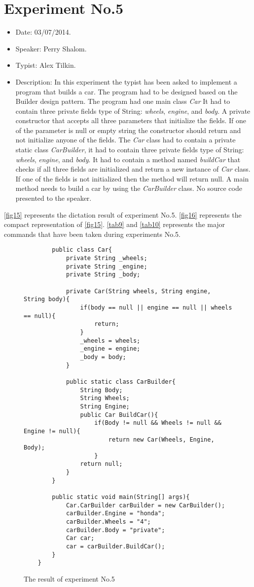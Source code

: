 \section{Experiment No.5}
\begin{itemize}
	\item Date: 03/07/2014.
	\item Speaker: Perry Shalom.
	\item Typist: Alex Tilkin.
	\item Description: In this experiment the typist has been asked to implement a program that builds a car. The program had to be designed based on the Builder design pattern. The program had one main class \textit{Car} It had to contain three private fields type of String: \textit{wheels}, \textit{engine}, and \textit{body}. A private constructor that accepts all three parameters that initialize the fields. If one of the parameter is null or empty string the constructor should return and not initialize anyone of the fields. The \textit{Car} class had to contain a private static class \textit{CarBuilder}, it had to contain three private fields type of String: \textit{wheels}, \textit{engine}, and \textit{body}. It had to contain a method named \textit{buildCar} that checks if all three fields are initialized and return a new instance of \textit{Car} class. If one of the fields is not initialized then the method will return null. A main method needs to build a car by using the \textit{CarBuilder} class. No source code presented to the speaker.
\end{itemize}
\autoref{fig15} represents the dictation result of experiment No.5. \autoref{fig16} represents the compact representation of \autoref{fig15}. \autoref{tab9} and \autoref{tab10} represents the major commands that have been taken during experiments No.5.
\begin{figure}[H]
	\begin{lstlisting}
		public class Car{
			private String _wheels;
			private String _engine;
			private String _body;
			
			private Car(String wheels, String engine, String body){
				if(body == null || engine == null || wheels == null){
					return;
				}
				_wheels = wheels;
				_engine = engine;
				_body = body;
			}
			
			public static class CarBuilder{
				String Body;
				String Wheels;
				String Engine;
				public Car BuildCar(){
					if(Body != null && Wheels != null && Engine != null){
						return new Car(Wheels, Engine, Body);
					}
				return null;
			}
		}
		
		public static void main(String[] args){
			Car.CarBuilder carBuilder = new CarBuilder();
			carBuilder.Engine = "honda";
			carBuilder.Wheels = "4";
			carBuilder.Body = "private";
			Car car;
			car = carBuilder.BuildCar();
		}
	}
	\end{lstlisting}
	\caption{The result of experiment No.5}
	\label{fig15}
\end{figure}
